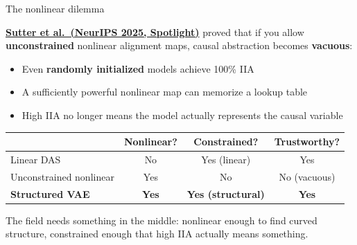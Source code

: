 \documentclass[aspectratio=169,11pt]{beamer}
\begin{document}
\begin{frame}{The nonlinear dilemma}

\textbf{\href{https://arxiv.org/abs/2501.02043}{Sutter et al.\ (NeurIPS 2025, Spotlight)}} proved that if you allow \textbf{unconstrained} nonlinear alignment maps, causal abstraction becomes \textbf{vacuous}:

\vspace{0.3em}
\begin{itemize}\setlength\itemsep{2pt}
  \item Even \textbf{randomly initialized} models achieve 100\% IIA
  \item A sufficiently powerful nonlinear map can memorize a lookup table
  \item High IIA no longer means the model actually represents the causal variable
\end{itemize}

\vspace{0.5em}
{\small
\begin{tabular}{lccc}
\toprule
& \textbf{Nonlinear?} & \textbf{Constrained?} & \textbf{Trustworthy?} \\
\midrule
Linear DAS & No & Yes (linear) & Yes \\
Unconstrained nonlinear & Yes & No & No (vacuous) \\
\textbf{Structured VAE} & \textbf{Yes} & \textbf{Yes (structural)} & \textbf{Yes} \\
\bottomrule
\end{tabular}
}

\vspace{0.5em}
The field needs something in the middle: nonlinear enough to find curved structure, constrained enough that high IIA actually means something.
\end{frame}
\end{document}
